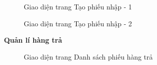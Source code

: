\begin{figure}[H]
    \begin{center}
        \caption{Giao diện trang Tạo phiếu nhập - 1}
        \label{result_tao_phieu_nhap_1}
    \end{center}
\end{figure}

\begin{figure}[H]
    \begin{center}
        \caption{Giao diện trang Tạo phiếu nhập - 2}
        \label{result_tao_phieu_nhap_2}
    \end{center}
\end{figure}

\textbf{Quản lí hàng trả}

\begin{figure}[H]
    \begin{center}
        \caption{Giao diện trang Danh sách phiếu hàng trả}
        \label{result_danh_sach_hang_tra}
    \end{center}
\end{figure}

